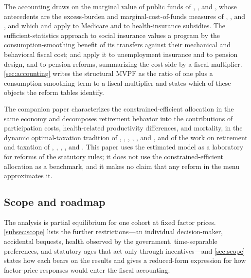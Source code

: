 The accounting draws on the marginal value of public funds of \citet{hendren2016policy}, \citet{hendren2020unified}, and \citet{finkelstein2020welfare}, whose antecedents are the excess-burden and marginal-cost-of-funds measures of \citet{mayshar1990measures}, \citet{slemrod1996costs}, and \citet{kleven2006marginal}, and which \citet{finkelstein2008did} and \citet{finkelstein2019subsidizing} apply to Medicare and to health-insurance subsidies. The sufficient-statistics approach to social insurance \citep{baily1978some,chetty2006general,chetty2008moral,chetty2009sufficient,chetty2013social,kleven2021sufficient} values a program by the consumption-smoothing benefit of its transfers against their mechanical and behavioral fiscal cost; \citet{landais2021value} and \citet{kolsrud2024retirement} apply it to unemployment insurance and to pension design, and \citet{haller2022welfare} to pension reforms, summarizing the cost side by a fiscal multiplier. \autoref{sec:accounting} writes the structural MVPF as the ratio of one plus a consumption-smoothing term to a fiscal multiplier and states which of these objects the reform tables identify.

The companion paper \citep{ndiaye2026flexible} characterizes the constrained-efficient allocation in the same economy and decomposes retirement behavior into the contributions of participation costs, health-related productivity differences, and mortality, in the dynamic optimal-taxation tradition of \citet{diamond1978model}, \citet{golosov2006designing}, \citet{farhi2013insurance}, \citet{golosov2016redistribution}, \citet{Stantcheva2017}, and \citet{shourideh2015incentives}, and of the work on retirement and taxation of \citet{cremer2004social}, \citet{grochulski2010nonseparable}, \citet{michau2014optimal}, \citet{chone2014income}, and \citet{hosseini2019retirement}. This paper uses the estimated model as a laboratory for reforms of the statutory rules; it does not use the constrained-efficient allocation as a benchmark, and it makes no claim that any reform in the menu approximates it.

\subsection{Scope and roadmap}\label{subsec:roadmap}

The analysis is partial equilibrium for one cohort at fixed factor prices. \autoref{subsec:scope} lists the further restrictions---an individual decision-maker, accidental bequests, health observed by the government, time-separable preferences, and statutory ages that act only through incentives---and \autoref{sec:scope} states how each bears on the results and gives a reduced-form expression for how factor-price responses would enter the fiscal accounting.

